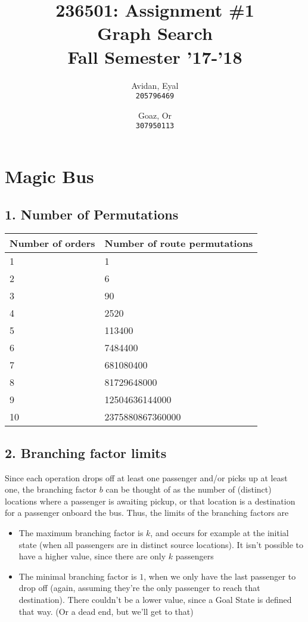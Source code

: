 \documentclass{article}
\begin{document}
\title{%
  236501: Assignment \#1 \\
  \large Graph Search \\
    Fall Semester '17-'18}

\author{
  Avidan, Eyal \\
  \texttt{205796469}
  \and
  Goaz, Or \\
  \texttt{307950113}
}

\maketitle

\section*{Magic Bus}
\subsection*{1. Number of Permutations}
\begin{table}[!h!p]
\begin{center}
\begin{tabular}{l l}
\hline
\textbf{Number of orders} & \textbf{Number of route permutations} \\ \hline \hline
1 & 1 \\ \hline
2 & 6 \\ \hline
3 & 90 \\ \hline
4 & 2520 \\ \hline
5 & 113400 \\ \hline
6 & 7484400 \\ \hline
7 & 681080400 \\ \hline
8 & 81729648000 \\ \hline
9 & 12504636144000 \\ \hline
10 & 2375880867360000 \\ 
\hline\hline
\end{tabular}
\end{center}
\end{table}

 
\subsection*{2. Branching factor limits}
Since each operation drops off at least one passenger and/or picks up at least one, the branching factor $b$ can be thought of as the number of (distinct) locations where a passenger is awaiting pickup, or that location is a destination for a passenger onboard the bus.
Thus, the limits of the branching factors are
\begin{itemize}
\item The maximum branching factor is $k$, and occurs for example at the initial state (when all passengers are in distinct source locations). It isn't possible to have a higher value, since there are only $k$ passengers
\item The minimal branching factor is $1$, when we only have the last passenger to drop off (again, assuming they're the only passenger to reach that destination). There couldn't be a lower value, since a Goal State is defined that way. (Or a dead end, but we'll get to that)
\end{itemize}
\end{document}
